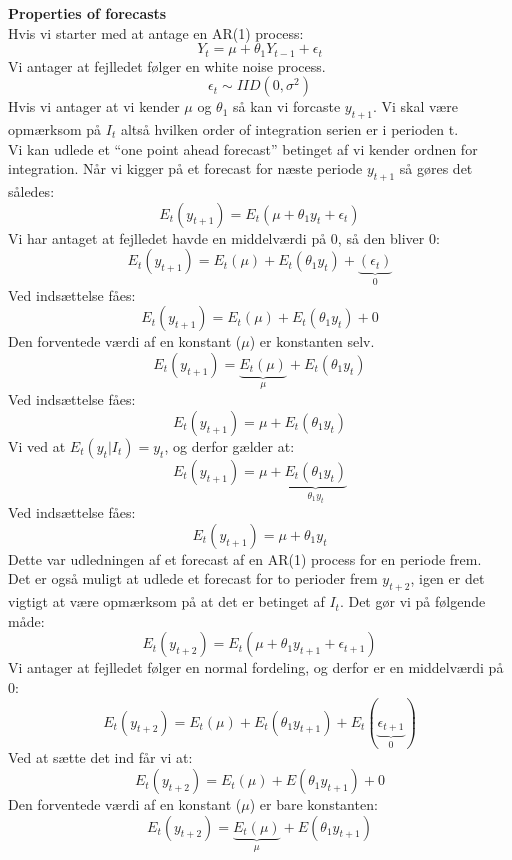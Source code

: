\documentclass[
  10pt,
]{article}
\begin{document}
\textbf{Properties of forecasts}\\
Hvis vi starter med at antage en AR(1) process:\\
\[Y_t = \mu + \theta_1 Y_{t-1} + \epsilon_t \] Vi antager at fejlledet
følger en white noise process.\\
\[\epsilon_t \sim IID(0,\sigma^2) \] Hvis vi antager at vi kender
\(\mu\) og \(\theta_1\) så kan vi forcaste \(y_{t+1}\). Vi skal være
opmærksom på \(I_t\) altså hvilken order of integration serien er i
perioden t.\\
Vi kan udlede et ``one point ahead forecast'' betinget af vi kender
ordnen for integration. Når vi kigger på et forecast for næste periode
\(y_{t+1}\) så gøres det således:\\
\[E_t(y_{t+1})=E_t(\mu + \theta_1 y_t + \epsilon_t) \] Vi har antaget at
fejlledet havde en middelværdi på 0, så den bliver 0:\\
\[E_t(y_{t+1})=E_t(\mu) + E_t(\theta_1 y_t) + \underbrace{(\epsilon_t)}_\text{$0$} \]
Ved indsættelse fåes:\\
\[E_t(y_{t+1})=E_t(\mu) + E_t(\theta_1 y_t) + 0 \] Den forventede værdi
af en konstant (\(\mu\)) er konstanten selv.\\
\[E_t(y_{t+1})=\underbrace{E_t(\mu)}_\text{$\mu$} + E_t(\theta_1 y_t) \]
Ved indsættelse fåes:\\
\[E_t(y_{t+1})=\mu + E_t(\theta_1 y_t) \] Vi ved at
\(E_t(y_t|I_t)=y_t\), og derfor gælder at:\\
\[E_t(y_{t+1})=\mu + \underbrace{E_t(\theta_1 y_t)}_\text{$\theta_1 y_t$} \]
Ved indsættelse fåes:\\
\[E_t(y_{t+1})=\mu + \theta_1 y_t \] Dette var udledningen af et
forecast af en AR(1) process for en periode frem.\\
Det er også muligt at udlede et forecast for to perioder frem
\(y_{t+2}\), igen er det vigtigt at være opmærksom på at det er betinget
af \(I_t\). Det gør vi på følgende måde:\\
\[E_t(y_{t+2}) = E_t(\mu + \theta_1 y_{t+1} + \epsilon_{t+1})  \] Vi
antager at fejlledet følger en normal fordeling, og derfor er en
middelværdi på 0:\\
\[E_t(y_{t+2}) = E_t(\mu) + E_t(\theta_1 y_{t+1}) + E_t(\underbrace{\epsilon_{t+1} }_\text{$0$}) \]
Ved at sætte det ind får vi at:\\
\[E_t(y_{t+2}) = E_t(\mu) +E(\theta_1 y_{t+1}) + 0 \] Den forventede
værdi af en konstant (\(\mu\)) er bare konstanten:\\
\[E_t(y_{t+2}) = \underbrace{E_t(\mu)}_\text{$\mu$} + E(\theta_1 y_{t+1}) \]
\end{document}

